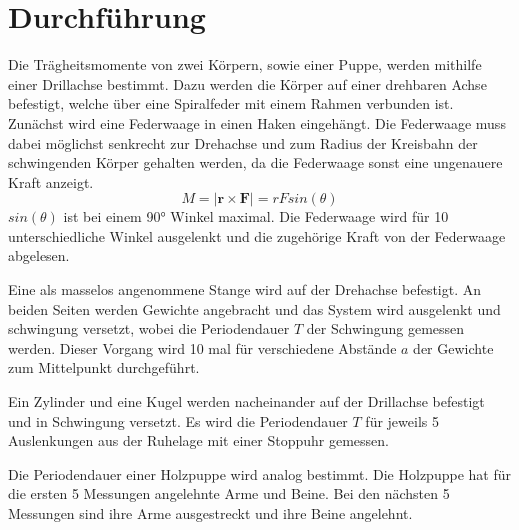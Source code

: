 \section{Durchführung}
\label{sec:Durchführung}
Die Trägheitsmomente von zwei Körpern, sowie einer Puppe, werden mithilfe
einer Drillachse bestimmt. Dazu werden die Körper auf einer drehbaren Achse befestigt,
welche über eine Spiralfeder mit einem Rahmen verbunden ist. Zunächst wird eine Federwaage
in einen Haken eingehängt. Die Federwaage muss dabei möglichst senkrecht zur Drehachse
und zum Radius der Kreisbahn der schwingenden Körper gehalten werden, da
die Federwaage sonst eine ungenauere Kraft anzeigt.
\begin{equation}
  M = |\symbf{r} \times \symbf{F}| = r F sin(\theta)
\end{equation}
$sin(\theta)$ ist bei einem 90° Winkel maximal. Die Federwaage wird für 10 unterschiedliche
Winkel ausgelenkt und die zugehörige Kraft von der Federwaage abgelesen.

Eine als masselos angenommene Stange wird auf der Drehachse befestigt. An beiden
Seiten werden Gewichte angebracht und das System wird ausgelenkt und schwingung
versetzt, wobei die Periodendauer $T$ der Schwingung gemessen werden. Dieser Vorgang
wird 10 mal für verschiedene Abstände $a$ der Gewichte zum Mittelpunkt durchgeführt.

Ein Zylinder und eine Kugel werden nacheinander auf der Drillachse befestigt und
in Schwingung versetzt. Es wird die Periodendauer $T$ für jeweils 5 Auslenkungen
aus der Ruhelage mit einer Stoppuhr gemessen.

Die Periodendauer einer Holzpuppe wird analog bestimmt. Die Holzpuppe
hat für die ersten 5 Messungen angelehnte Arme und Beine. Bei den nächsten 5
Messungen sind ihre Arme ausgestreckt und ihre Beine angelehnt.
